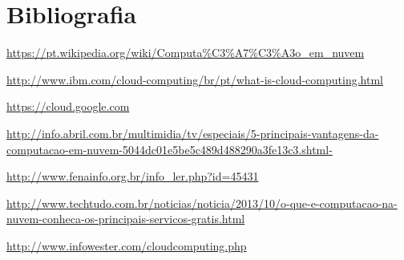 \section*{Bibliografia}

\begin{itemise}
    \item \url{https://pt.wikipedia.org/wiki/Computa\%C3\%A7\%C3\%A3o_em_nuvem}
    \item \url{http://www.ibm.com/cloud-computing/br/pt/what-is-cloud-computing.html}
    \item \url{https://cloud.google.com}
    \item \url{http://info.abril.com.br/multimidia/tv/especiais/5-principais-vantagens-da-computacao-em-nuvem-5044dc01e5be5c489d488290a3fe13c3.shtml-}
    \item \url{http://www.fenainfo.org.br/info_ler.php?id=45431}
    \item \url{http://www.techtudo.com.br/noticias/noticia/2013/10/o-que-e-computacao-na-nuvem-conheca-os-principais-servicos-gratis.html}
    \item \url{http://www.infowester.com/cloudcomputing.php}
\end{itemise}
